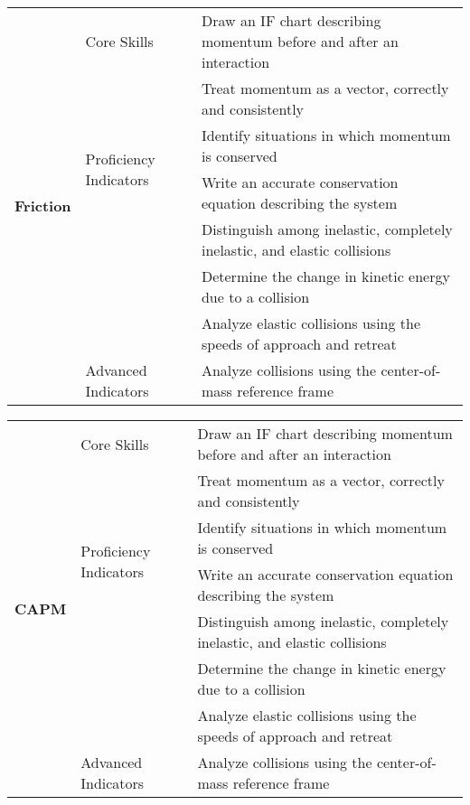 \centering
{\footnotesize \begin{tabular}{| p{.35 cm} | p{1.7 cm} | p{14.3 cm} | }
\hline
\multirow{8}{*}{\begin{sideways}\parbox{4mm}{{\large{\bf Friction}}}\end{sideways}}  &Core Skills 		& Draw an IF chart describing momentum before and after an interaction  \\ \cline{3-3}
& 					& Treat momentum as a vector, correctly and consistently  \\ \cline{2-3}					
& \multirow{2}{*}{\parbox{1.7cm}{Proficiency Indicators}}	& Identify situations in which momentum is conserved \\ \cline{3-3}
&					& Write an accurate conservation equation describing the system \\ \cline{3-3}
& 					& Distinguish among inelastic, completely inelastic, and elastic collisions \\ \cline{3-3}
& 					& Determine the change in kinetic energy due to a collision \\ \cline{3-3}
&					& Analyze elastic collisions using the speeds of approach and retreat \\ \cline{2-3}
& Advanced Indicators	& Analyze collisions using the center-of-mass reference frame \\ \hline
\end{tabular} }
\vspace{2 mm}


\centering
{\footnotesize \begin{tabular}{| p{.35 cm} | p{1.7 cm} | p{14.3 cm} | }
\hline
\multirow{8}{*}{\begin{sideways}\parbox{4mm}{{\large{\bf CAPM}}}\end{sideways}}  &Core Skills 		& Draw an IF chart describing momentum before and after an interaction  \\ \cline{3-3}
& 					& Treat momentum as a vector, correctly and consistently  \\ \cline{2-3}					
& \multirow{2}{*}{\parbox{1.7cm}{Proficiency Indicators}}	& Identify situations in which momentum is conserved \\ \cline{3-3}
&					& Write an accurate conservation equation describing the system \\ \cline{3-3}
& 					& Distinguish among inelastic, completely inelastic, and elastic collisions \\ \cline{3-3}
& 					& Determine the change in kinetic energy due to a collision \\ \cline{3-3}
&					& Analyze elastic collisions using the speeds of approach and retreat \\ \cline{2-3}
& Advanced Indicators	& Analyze collisions using the center-of-mass reference frame \\ \hline
\end{tabular} }
\vspace{2 mm}


